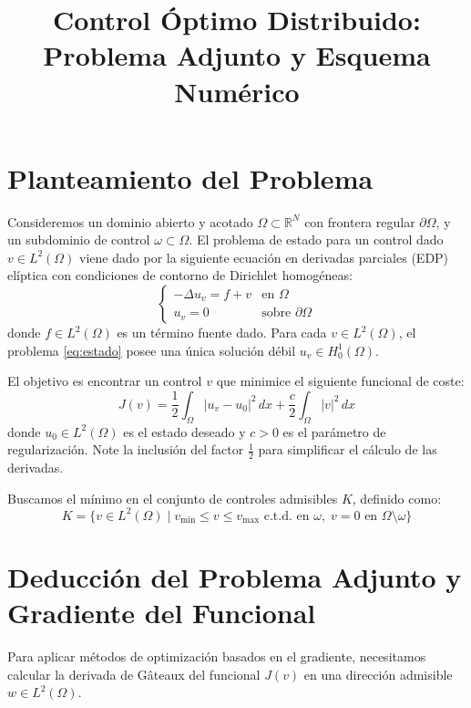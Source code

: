 \documentclass[11pt,a4paper]{article}
\title{Control Óptimo Distribuido: Problema Adjunto y Esquema Numérico}
\author{}
\date{}
\begin{document}
	
	\maketitle
	
	\section{Planteamiento del Problema}
	
	Consideremos un dominio abierto y acotado $\Omega \subset \mathbb{R}^N$ con frontera regular $\partial\Omega$, y un subdominio de control $\omega \subset \Omega$. El problema de estado para un control dado $v \in L^2(\Omega)$ viene dado por la siguiente ecuación en derivadas parciales (EDP) elíptica con condiciones de contorno de Dirichlet homogéneas:
	\begin{equation} \label{eq:estado}
		\begin{cases}
			-\Delta u_v = f + v & \text{en } \Omega \\
			u_v = 0 & \text{sobre } \partial\Omega
		\end{cases}
	\end{equation}
	donde $f \in L^2(\Omega)$ es un término fuente dado. Para cada $v \in L^2(\Omega)$, el problema \eqref{eq:estado} posee una única solución débil $u_v \in H^1_0(\Omega)$.
	
	El objetivo es encontrar un control $v$ que minimice el siguiente funcional de coste:
	\begin{equation} \label{eq:funcional}
		J(v) = \frac{1}{2} \int_\Omega |u_v - u_0|^2 \, dx + \frac{c}{2} \int_\Omega |v|^2 \, dx
	\end{equation}
	donde $u_0 \in L^2(\Omega)$ es el estado deseado y $c > 0$ es el parámetro de regularización. Note la inclusión del factor $\frac{1}{2}$ para simplificar el cálculo de las derivadas.
	
	Buscamos el mínimo en el conjunto de controles admisibles $K$, definido como:
	\begin{equation*}
		K = \{ v \in L^2(\Omega) \mid v_{\min} \le v \le v_{\max} \text{ c.t.d. en } \omega, \; v = 0 \text{ en } \Omega \setminus \omega \}
	\end{equation*}
	
	\section{Deducción del Problema Adjunto y Gradiente del Funcional}
	
	Para aplicar métodos de optimización basados en el gradiente, necesitamos calcular la derivada de Gâteaux del funcional $J(v)$ en una dirección admisible $w \in L^2(\Omega)$.
	
\end{document}
